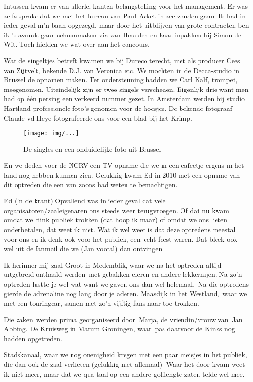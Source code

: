 \documentclass[10pt,twoside,openright]{memoir}
\begin{document}
Intussen kwam er van allerlei kanten belangstelling voor het management. Er was zelfs sprake dat we met het bureau van Paul Acket in zee zouden gaan. Ik had in ieder geval m’n baan opgezegd, maar door het uitblijven van grote contracten ben ik ’s avonds gaan schoonmaken via van Heusden en kaas inpakken bij Simon de Wit. Toch hielden we wat over aan het concours.

Wat de singeltjes betreft kwamen we bij Dureco terecht, met als producer Cees van Zijtvelt, bekende D.J. van Veronica etc. We mochten in de Decca-studio in Brussel de opnamen maken. Ter ondersteuning hadden we Carl Kalf, trompet, meegenomen. Uiteindelijk zijn er twee singels verschenen. Eigenlijk drie want men had op één persing een verkeerd nummer gezet. In Amsterdam werden bij studio Hartland professionele foto’s genomen voor de hoesjes. De bekende fotograaf Claude vd Heye fotografeerde ons voor een blad bij het Krimp.

\begin{figure}[t]
\texttt{[image: img/...]}
\caption{De singles en een onduidelijke foto uit Brussel}
\end{figure}

En we deden voor de NCRV een TV-opname die we in een cafeetje ergens in het land nog hebben kunnen zien. Gelukkig kwam Ed in 2010 met een opname van dit optreden die een van zoons had weten te bemachtigen.

Ed (in de krant) Opvallend was in ieder geval dat vele organisatoren/zaaleigenaren ons steeds weer terugvroegen. Of dat nu kwam omdat we flink publiek trokken (dat hoop ik maar) of omdat we ons lieten onderbetalen, dat weet ik niet. Wat ik wel weet is dat deze optredens meestal voor ons en ik denk ook voor het publiek, een echt feest waren. Dat bleek ook wel uit de fanmail die we (Jan vooral) dan ontvingen. 

Ik herinner mij zaal Groot in Medemblik, waar we na het optreden altijd uitgebreid onthaald werden met gebakken eieren en andere lekkernijen. Na zo'n optreden lustte je wel wat want we gaven ons dan wel helemaal. Na die optredens gierde de adrenaline nog lang door je aderen. Maasdijk in het Westland, waar we met een touringcar, samen met zo'n vijftig fans naar toe trokken. 

Die zaken werden prima georganiseerd door Marja, de vriendin/vrouw van Jan Abbing. De Kruisweg in Marum Groningen, waar pas daarvoor de Kinks nog hadden opgetreden.

Stadskanaal, waar we nog onenigheid kregen met een paar meisjes in het publiek, die dan ook de zaal verlieten (gelukkig niet allemaal). Waar het door kwam weet ik niet meer, maar dat we qua taal op een andere golflengte zaten telde wel mee. 
\end{document}
